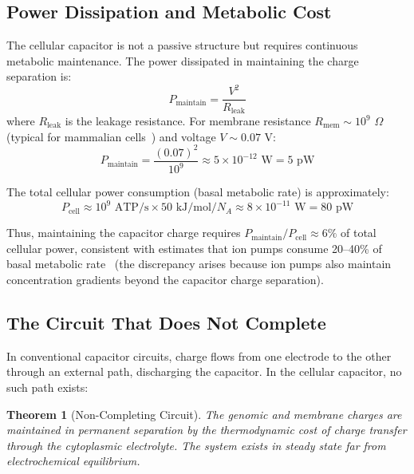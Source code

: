 \documentclass[twocolumn,10pt,aps,prd,superscriptaddress,floatfix,nofootinbib]{revtex4-2}
\newtheorem{theorem}{Theorem}[section]
\theoremstyle{remark}
\begin{document}
\subsection{Power Dissipation and Metabolic Cost}

The cellular capacitor is not a passive structure but requires continuous metabolic maintenance. The power dissipated in maintaining the charge separation is:
\begin{equation}
P_{\mathrm{maintain}} = \frac{V^2}{R_{\mathrm{leak}}}
\label{eq:power_dissipation}
\end{equation}
where $R_{\mathrm{leak}}$ is the leakage resistance. For membrane resistance $R_{\mathrm{mem}} \sim 10^{9}$ $\Omega$ (typical for mammalian cells~\cite{Hille2001}) and voltage $V \sim 0.07$ V:
\begin{equation}
P_{\mathrm{maintain}} = \frac{(0.07)^2}{10^{9}} \approx 5 \times 10^{-12} \text{ W} = 5 \text{ pW}
\end{equation}

The total cellular power consumption (basal metabolic rate) is approximately:
\begin{equation}
P_{\mathrm{cell}} \approx 10^{9} \text{ ATP/s} \times 50 \text{ kJ/mol} / N_A \approx 8 \times 10^{-11} \text{ W} = 80 \text{ pW}
\end{equation}

Thus, maintaining the capacitor charge requires $P_{\mathrm{maintain}}/P_{\mathrm{cell}} \approx 6\%$ of total cellular power, consistent with estimates that ion pumps consume 20--40\% of basal metabolic rate~\cite{Rolfe1997} (the discrepancy arises because ion pumps also maintain concentration gradients beyond the capacitor charge separation).

\subsection{The Circuit That Does Not Complete}

In conventional capacitor circuits, charge flows from one electrode to the other through an external path, discharging the capacitor. In the cellular capacitor, no such path exists:

\begin{theorem}[Non-Completing Circuit]
\label{thm:non_completing}
The genomic and membrane charges are maintained in permanent separation by the thermodynamic cost of charge transfer through the cytoplasmic electrolyte. The system exists in steady state far from electrochemical equilibrium.
\end{theorem}
\end{document}
